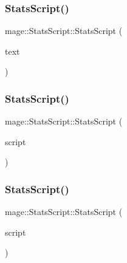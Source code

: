 \subsubsection{\texorpdfstring{Stats\+Script()}{StatsScript()}\hspace{0.1cm}{\footnotesize\ttfamily [1/3]}}
{\footnotesize\ttfamily mage\+::\+Stats\+Script\+::\+Stats\+Script (\begin{DoxyParamCaption}\item[{\hyperlink{namespacemage_a1e01ae66713838a7a67d30e44c67703e}{Shared\+Ptr}$<$ \hyperlink{classmage_1_1_sprite_text}{Sprite\+Text} $>$}]{text }\end{DoxyParamCaption})\hspace{0.3cm}{\ttfamily [explicit]}}

\hypertarget{classmage_1_1_stats_script_aab237b7c391d7ca7ad96cfa33a3aac81}{}\label{classmage_1_1_stats_script_aab237b7c391d7ca7ad96cfa33a3aac81} 
\subsubsection{\texorpdfstring{Stats\+Script()}{StatsScript()}\hspace{0.1cm}{\footnotesize\ttfamily [2/3]}}
{\footnotesize\ttfamily mage\+::\+Stats\+Script\+::\+Stats\+Script (\begin{DoxyParamCaption}\item[{const \hyperlink{classmage_1_1_stats_script}{Stats\+Script} \&}]{script }\end{DoxyParamCaption})\hspace{0.3cm}{\ttfamily [delete]}}

\hypertarget{classmage_1_1_stats_script_af511d7e2e6bec30cd05782de94c65abe}{}\label{classmage_1_1_stats_script_af511d7e2e6bec30cd05782de94c65abe} 
\subsubsection{\texorpdfstring{Stats\+Script()}{StatsScript()}\hspace{0.1cm}{\footnotesize\ttfamily [3/3]}}
{\footnotesize\ttfamily mage\+::\+Stats\+Script\+::\+Stats\+Script (\begin{DoxyParamCaption}\item[{\hyperlink{classmage_1_1_stats_script}{Stats\+Script} \&\&}]{script }\end{DoxyParamCaption})\hspace{0.3cm}{\ttfamily [default]}}

